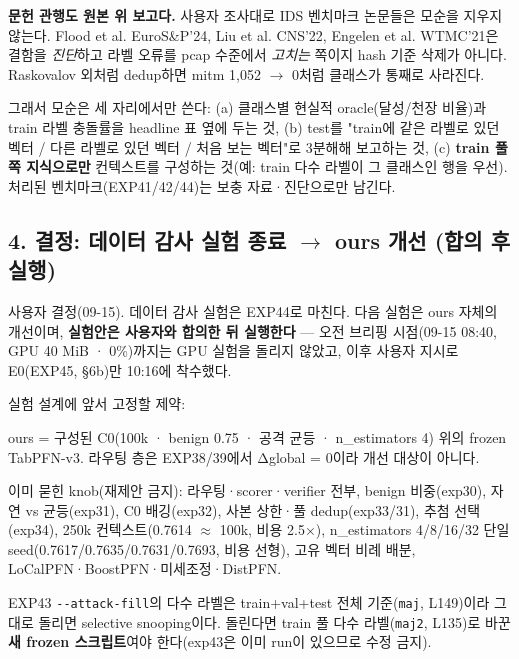 \par\noindent \textbullet\enspace \textbf{문헌 관행도 원본 위 보고다.} 사용자 조사대로 IDS 벤치마크 논문들은 모순을 지우지 않는다. Flood et al. EuroS\&P'24, Liu et al. CNS'22, Engelen et al. WTMC'21은 결함을 \emph{진단}하고 라벨 오류를 pcap 수준에서 \emph{고치는} 쪽이지 hash 기준 삭제가 아니다. Raskovalov 외처럼 dedup하면 mitm 1,052 \ensuremath{\rightarrow} 0처럼 클래스가 통째로 사라진다.


그래서 모순은 세 자리에서만 쓴다: (a) 클래스별 현실적 oracle(달성/\allowbreak{}천장 비율)과 train 라벨 충돌률을 headline 표 옆에 두는 것, (b) test를 "train에 같은 라벨로 있던 벡터 /\allowbreak{} 다른 라벨로 있던 벡터 /\allowbreak{} 처음 보는 벡터"로 3분해해 보고하는 것, (c) \textbf{train 풀 쪽 지식으로만} 컨텍스트를 구성하는 것(예: train 다수 라벨이 그 클래스인 행을 우선). 처리된 벤치마크(EXP41/\allowbreak{}42/\allowbreak{}44)는 보충 자료·진단으로만 남긴다.

\subsection{4. 결정: 데이터 감사 실험 종료  \ensuremath{\rightarrow}  ours 개선 (합의 후 실행)}
사용자 결정(09-15). 데이터 감사 실험은 EXP44로 마친다. 다음 실험은 ours 자체의 개선이며, \textbf{실험안은 사용자와 합의한 뒤 실행한다} — 오전 브리핑 시점(09-15 08:40, GPU 40 MiB · 0\%)까지는 GPU 실험을 돌리지 않았고, 이후 사용자 지시로 E0(EXP45, §6b)만 10:16에 착수했다.

실험 설계에 앞서 고정할 제약:

\par\noindent \textbullet\enspace ours =\allowbreak{} 구성된 C0(100k · benign 0.75 · 공격 균등 · n\_\allowbreak{}estimators 4) 위의 frozen TabPFN-v3. 라우팅 층은 EXP38/\allowbreak{}39에서 Δglobal =\allowbreak{} 0이라 개선 대상이 아니다.


\par\noindent \textbullet\enspace 이미 묻힌 knob(재제안 금지): 라우팅·scorer·verifier 전부, benign 비중(exp30), 자연 vs 균등(exp31), C0 배깅(exp32), 사본 상한·풀 dedup(exp33/\allowbreak{}31), 추첨 선택(exp34), 250k 컨텍스트(0.7614 \ensuremath{\approx} 100k, 비용 2.5×), n\_\allowbreak{}estimators 4/\allowbreak{}8/\allowbreak{}16/\allowbreak{}32 단일 seed(0.7617/\allowbreak{}0.7635/\allowbreak{}0.7631/\allowbreak{}0.7693, 비용 선형), 고유 벡터 비례 배분, LoCalPFN·BoostPFN·미세조정·DistPFN.


\par\noindent \textbullet\enspace EXP43 \texttt{-\allowbreak{}-\allowbreak{}attack\allowbreak{}-\allowbreak{}fill}의 다수 라벨은 train+\allowbreak{}val+\allowbreak{}test 전체 기준(\texttt{maj}, L149)이라 그대로 돌리면 selective snooping이다. 돌린다면 train 풀 다수 라벨(\texttt{maj2}, L135)로 바꾼 \textbf{새 frozen 스크립트}여야 한다(exp43은 이미 run이 있으므로 수정 금지).


